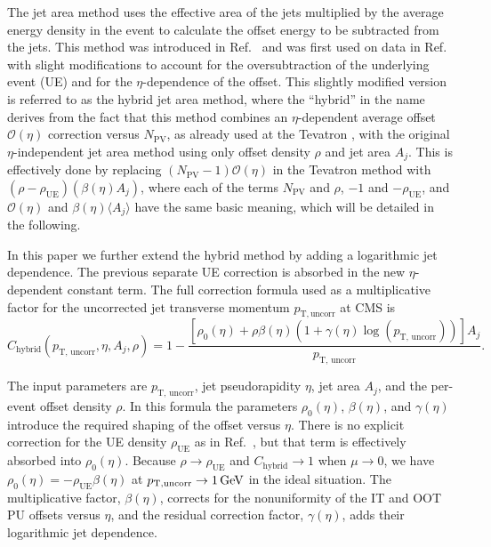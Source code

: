 \documentclass[11pt,twoside,a4paper,cmspaper,final,collab]{cms-tdr}
\begin{document}
The jet area method uses the effective area of the jets multiplied by the average energy density in the event to calculate the offset energy to be subtracted from the jets. This method was introduced in Ref.~\cite{fastjet} and was first used on data in Ref.~\cite{JEC_JINST} with slight modifications to account for the oversubtraction of the underlying event (UE) and for the $\eta$-dependence of the offset. This slightly modified version is referred to as the hybrid jet area method, where the ``hybrid'' in the name derives from the fact that this method combines an $\eta$-dependent average offset $\mathcal{O}(\eta)$ correction versus $N_\mathrm{PV}$, as already used at the Tevatron \cite{D0_JEC}, with the original $\eta$-independent jet area method using only offset \pt density $\rho$ and jet area $A_j$. This is effectively done by replacing $(N_\mathrm{ PV}-1)\mathcal{O}(\eta)$ in the Tevatron method with $(\rho-\rho_\mathrm{UE})(\beta(\eta) A_j)$, where each of the terms $N_\mathrm{PV}$ and $\rho$, $-1$ and $-\rho_\mathrm{ UE}$, and $\mathcal{O}(\eta)$ and $\beta(\eta)\langle A_j\rangle$ have the same basic meaning, which will be detailed in the following.

In this paper we further extend the hybrid method by adding a logarithmic jet \pt dependence. The previous separate UE correction is absorbed in the new $\eta$-dependent constant term.
The full correction formula used as a multiplicative factor for the uncorrected jet transverse momentum $p_\mathrm{T, uncorr}$ at CMS is
\begin{equation}\label{eq:chybrid}
C_\text{hybrid}(p_\text{T, uncorr},\eta,A_j,\rho) = 1 - \frac{\left[\rho_{0}(\eta) + \rho\beta(\eta)\left(1 + \gamma(\eta)\log(p_\text{T, uncorr})\right)\right] A_{j}}{p_\text{T, uncorr}}.
\end{equation}

The input parameters are $p_\text{T, uncorr}$,
jet pseudorapidity $\eta$, jet area $A_j$, and the per-event \pt offset density $\rho$.
In this formula
the parameters $\rho_0(\eta)$, $\beta(\eta)$, and $\gamma(\eta)$ introduce the required shaping of the offset versus $\eta$.
There is no explicit correction for the UE density $\rho_\mathrm{UE}$ as in Ref.~\cite{JEC_JINST}, but that term is effectively absorbed into $\rho_{0}(\eta)$.
Because $\rho\to\rho_\mathrm{UE}$ and $C_\text{hybrid}\to 1$ when $\mu\to 0$, we have $\rho_0(\eta)=-\rho_\mathrm{UE}\beta(\eta)$ at $p_\mathrm{T, uncorr}\to 1\,\text{Ge\hspace{-.08em}V}$ in the ideal situation.
The multiplicative factor, $\beta(\eta)$, corrects for the nonuniformity of the IT and OOT PU offsets versus $\eta$, and the residual correction factor, $\gamma(\eta)$, adds their logarithmic jet \pt dependence.
\end{document}
